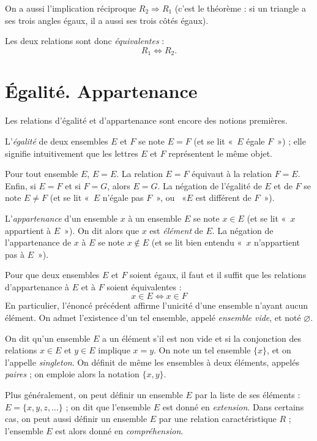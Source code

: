 \documentclass[12pt,parskip=full,chapterprefix=true,a5paper]{scrbook}
\begin{document}
On a aussi l'implication réciproque \(R_2\Rightarrow R_1\) (c'est le théorème : si un triangle a ses trois angles égaux, il a aussi ses trois côtés égaux).

Les deux relations sont donc \emph{équivalentes} :
\[R_1\Leftrightarrow R_2.\]

\section{Égalité. Appartenance}
Les relations d'égalité et d'appartenance sont encore des notions premières.

L'\emph{égalité} de deux ensembles \(E\) et \(F\) se note \(E=F\) (et se lit «~\(E\) égale \(F\)~») ; elle signifie intuitivement que les lettres \(E\) et \(F\) représentent le même objet.

Pour tout ensemble \(E\), \(E=E\). La relation \(E=F\) équivaut à la relation \(F=E\). Enfin, si \(E=F\) et si \(F=G\), alors \(E=G\). La négation de l'égalité de \(E\) et de \(F\) se note \(E\neq F\) (et se lit «~\(E\) n'égale pas \(F\)~», ou ~«\(E\) est différent de \(F\)~»).

L'\emph{appartenance} d'un ensemble \(x\) à un ensemble \(E\) se note \(x\in E\) (et se lit «~\(x\) appartient à \(E\)~»). On dit alors que \(x\) est \emph{élément} de \(E\). La négation de l'appartenance de \(x\) à \(E\) se note \(x\notin E\) (et se lit bien entendu «~\(x\) n'appartient pas à \(E\)~»).

Pour que deux ensembles \(E\) et \(F\) soient égaux, il faut et il suffit que les relations d'appartenance à \(E\) et à \(F\) soient équivalentes :
\[
  x\in E \Leftrightarrow x\in F
\]
En particulier, l'énoncé précédent affirme l'unicité d'une ensemble n'ayant aucun élément. On admet l'existence d'un tel ensemble, appelé \emph{ensemble vide}, et noté \(\varnothing\).

On dit qu'un ensemble \(E\) a un élément s'il est non vide et si la conjonction des relations \(x\in E\) et \(y\in E\) implique \(x=y\). On note un tel ensemble \(\{x\}\), et on l'appelle \emph{singleton}. On définit de même les ensembles à deux éléments, appelés \emph{paires} ; on emploie alors la notation \(\{x,y\}\).

Plus généralement, on peut définir un ensemble \(E\) par la liste de ses éléments : \(E=\{x,y,z,\dots\}\) ; on dit que l'ensemble \(E\) est donné en \emph{extension}. Dans certains cas, on peut aussi définir un ensemble \(E\) par une relation caractéristique \(R\) ; l'ensemble \(E\) est alors donné en \emph{compréhension}.
\end{document}
